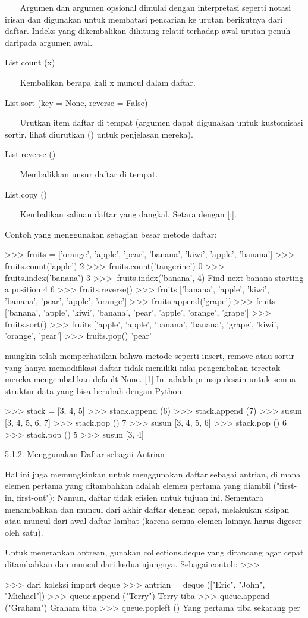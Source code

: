 ~~~ Argumen dan argumen opsional dimulai dengan interpretasi seperti notasi irisan dan digunakan untuk membatasi pencarian ke urutan berikutnya dari daftar. Indeks yang dikembalikan dihitung relatif terhadap awal urutan penuh daripada argumen awal. 

List.count (x) 

~~~ Kembalikan berapa kali x muncul dalam daftar. 

List.sort (key = None, reverse = False) 

~~~ Urutkan item daftar di tempat (argumen dapat digunakan untuk kustomisasi sortir, lihat diurutkan () untuk penjelasan mereka). 

List.reverse () 

~~~ Membalikkan unsur daftar di tempat. 

List.copy () 

~~~ Kembalikan salinan daftar yang dangkal. Setara dengan [:]. 

Contoh yang menggunakan sebagian besar metode daftar: 

>>> fruits = ['orange', 'apple', 'pear', 'banana', 'kiwi', 'apple', 'banana'] 
>>> fruits.count('apple') 
2 
>>> fruits.count('tangerine') 
0 
>>> fruits.index('banana') 
3 
>>>~fruits.index('banana', 4)        Find next banana starting a position 4 
6 
>>> fruits.reverse() 
>>> fruits 
['banana', 'apple', 'kiwi', 'banana', 'pear', 'apple', 'orange'] 
>>> fruits.append('grape') 
>>> fruits 
['banana', 'apple', 'kiwi', 'banana', 'pear', 'apple', 'orange', 'grape'] 
>>> fruits.sort() 
>>> fruits 
['apple', 'apple', 'banana', 'banana', 'grape', 'kiwi', 'orange', 'pear'] 
>>> fruits.pop() 
'pear' 

mungkin telah memperhatikan bahwa metode seperti insert, remove atau sortir yang hanya memodifikasi daftar tidak memiliki nilai pengembalian tercetak - mereka mengembalikan default None. [1] Ini adalah prinsip desain untuk semua struktur data yang bisa berubah dengan Python. 

>>> stack = [3, 4, 5] 
>>> stack.append (6) 
>>> stack.append (7) 
>>> susun 
[3, 4, 5, 6, 7] 
>>> stack.pop () 
7 
>>> susun 
[3, 4, 5, 6] 
>>> stack.pop () 
6 
>>> stack.pop () 
5 
>>> susun 
[3, 4] 

5.1.2. Menggunakan Daftar sebagai Antrian 

Hal ini juga memungkinkan untuk menggunakan daftar sebagai antrian, di mana elemen pertama yang ditambahkan adalah elemen pertama yang diambil ("first-in, first-out"); Namun, daftar tidak efisien untuk tujuan ini. Sementara menambahkan dan muncul dari akhir daftar dengan cepat, melakukan sisipan atau muncul dari awal daftar lambat (karena semua elemen lainnya harus digeser oleh satu). 

Untuk menerapkan antrean, gunakan collections.deque yang dirancang agar cepat ditambahkan dan muncul dari kedua ujungnya. Sebagai contoh: 
>>> 

>>> dari koleksi import deque 
>>> antrian = deque (["Eric", "John", "Michael"]) 
>>> queue.append ("Terry")       Terry tiba 
>>> queue.append ("Graham")       Graham tiba 
>>> queue.popleft ()       Yang pertama tiba sekarang per
